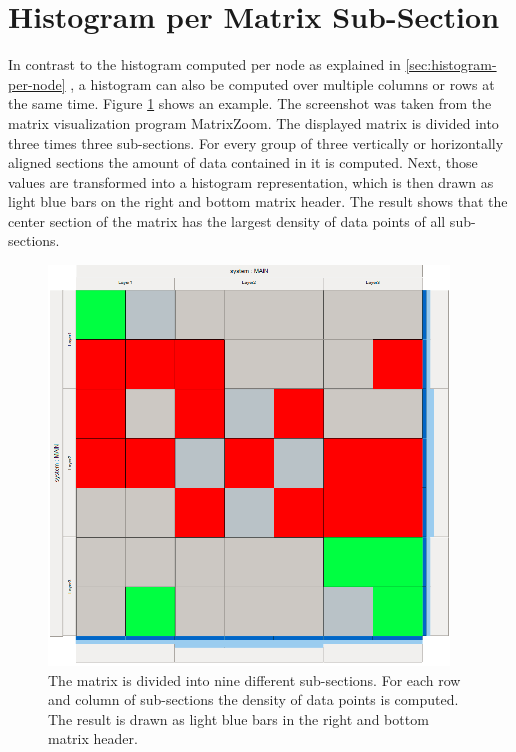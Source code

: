 \section{Histogram per Matrix Sub-Section}
In contrast to the histogram computed per node as explained in \ref{sec:histogram-per-node} , a histogram can also be computed over multiple columns or rows at the same time. Figure \ref{fig:header_matrixzoom_histogram} shows an example. The screenshot was taken from the matrix visualization program MatrixZoom. The displayed matrix is divided into three times three sub-sections. For every group of three vertically or horizontally aligned sections the amount of data contained in it is computed. Next, those values are transformed into a histogram representation, which is then drawn as light blue bars on the right and bottom matrix header. The result shows that the center section of the matrix has the largest density of data points of all sub-sections.

\begin{figure}[tp]
  \centering
  \includegraphics[keepaspectratio,width=\hsize,height=\halfh]
  {images/Header_MatrixZoom_histogram.png}
  \caption[Matrix Header with Histogram of Matrix Section Density]{
  The matrix is divided into nine different sub-sections. For each row and column of sub-sections the density of data points is computed. The result is drawn as light blue bars in the right and bottom matrix header.
  \label{fig:header_matrixzoom_histogram}}
\end{figure}
